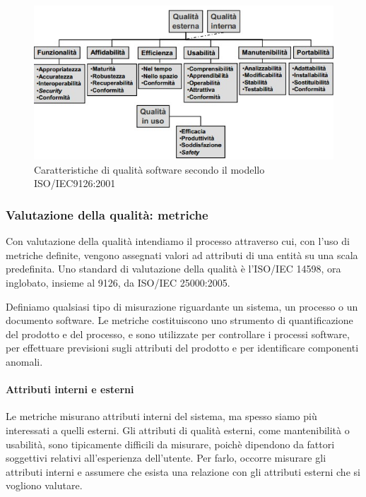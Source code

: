 \begin{figure}[h]
  \centering
  \includegraphics[scale=0.6]{imgs/isoiec_9126_2001.jpg}
  \caption{Caratteristiche di qualità software secondo il modello
    ISO/IEC9126:2001}
\end{figure}

\subsubsection{Valutazione della qualità: metriche}

Con valutazione della qualità intendiamo il processo attraverso cui, con l'uso
di metriche definite, vengono assegnati valori ad attributi di una entità su una
scala predefinita. Uno standard di valutazione della qualità è l'ISO/IEC 14598,
ora inglobato, insieme al 9126, da ISO/IEC 25000:2005.

Definiamo  qualsiasi tipo di misurazione riguardante un sistema,
un processo o un documento software. Le metriche costituiscono uno strumento di
quantificazione del prodotto e del processo, e sono utilizzate per controllare i
processi software, per effettuare previsioni sugli attributi del prodotto e per
identificare componenti anomali.

\paragraph{Attributi interni e esterni}

Le metriche misurano attributi interni del sistema, ma spesso siamo più
interessati a quelli esterni. Gli attributi di qualità esterni, come
mantenibilità o usabilità, sono tipicamente difficili da misurare, poichè
dipendono da fattori soggettivi relativi all'esperienza dell'utente. Per farlo,
occorre misurare gli attributi interni e assumere che esista una relazione con
gli attributi esterni che si vogliono valutare.

